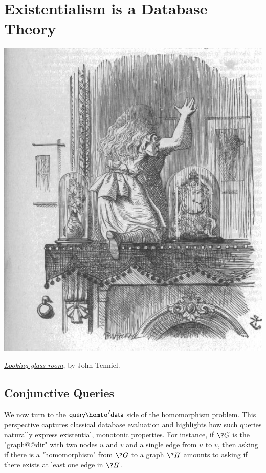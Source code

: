 \section{Existentialism is a Database Theory}
\label{sec:intro-existential}

\begin{marginfigure}[15em]
	\centering
	\includegraphics[width=\linewidth]{fig/intro/aliceroom.jpg}
	\caption{\href{https://commons.wikimedia.org/wiki/File:Aliceroom.jpg}{\emph{Looking glass room}}, by John Tenniel.}
\end{marginfigure}

\subsection{Conjunctive Queries}
\label{sec:intro-cq}

We now turn to the $\textsf{query} \homto^? \textsf{data}$ side of the homomorphism problem. This perspective captures classical database evaluation and highlights how such queries naturally express existential, monotonic properties.
For instance, if $\?G$ is the "graph@@dir" with
two nodes $u$ and $v$ and a single edge from $u$ to $v$,
then asking if there is a "homomorphism" from $\?G$ to a graph $\?H$ amounts
to asking if there exists at least one edge in $\?H$.

